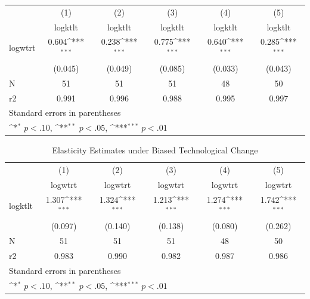 {
\def\sym#1{\ifmmode^{#1}\else\(^{#1}\)\fi}
\begin{tabular}{l*{5}{c}}
\hline\hline
                &\multicolumn{1}{c}{(1)}&\multicolumn{1}{c}{(2)}&\multicolumn{1}{c}{(3)}&\multicolumn{1}{c}{(4)}&\multicolumn{1}{c}{(5)}\\
                &\multicolumn{1}{c}{logktlt}&\multicolumn{1}{c}{logktlt}&\multicolumn{1}{c}{logktlt}&\multicolumn{1}{c}{logktlt}&\multicolumn{1}{c}{logktlt}\\
\hline
logwtrt         &    0.604\sym{***}&    0.238\sym{***}&    0.775\sym{***}&    0.640\sym{***}&    0.285\sym{***}\\
                &  (0.045)         &  (0.049)         &  (0.085)         &  (0.033)         &  (0.043)         \\
\hline
N               &       51         &       51         &       51         &       48         &       50         \\
r2              &    0.991         &    0.996         &    0.988         &    0.995         &    0.997         \\
\hline\hline
\multicolumn{6}{l}{\footnotesize Standard errors in parentheses}\\
\multicolumn{6}{l}{\footnotesize \sym{*} \(p<.10\), \sym{**} \(p<.05\), \sym{***} \(p<.01\)}\\
\end{tabular}
}
\begin{table}[htbp]\centering
\def\sym#1{\ifmmode^{#1}\else\(^{#1}\)\fi}
\caption{Elasticity Estimates under Biased Technological Change}
\begin{tabular}{l*{5}{c}}
\hline\hline
                    &\multicolumn{1}{c}{(1)}&\multicolumn{1}{c}{(2)}&\multicolumn{1}{c}{(3)}&\multicolumn{1}{c}{(4)}&\multicolumn{1}{c}{(5)}\\
                    &\multicolumn{1}{c}{logwtrt}&\multicolumn{1}{c}{logwtrt}&\multicolumn{1}{c}{logwtrt}&\multicolumn{1}{c}{logwtrt}&\multicolumn{1}{c}{logwtrt}\\
\hline
logktlt             &       1.307\sym{***}&       1.324\sym{***}&       1.213\sym{***}&       1.274\sym{***}&       1.742\sym{***}\\
                    &     (0.097)         &     (0.140)         &     (0.138)         &     (0.080)         &     (0.262)         \\
\hline
N                   &          51         &          51         &          51         &          48         &          50         \\
r2                  &       0.983         &       0.990         &       0.982         &       0.987         &       0.986         \\
\hline\hline
\multicolumn{6}{l}{\footnotesize Standard errors in parentheses}\\
\multicolumn{6}{l}{\footnotesize \sym{*} \(p<.10\), \sym{**} \(p<.05\), \sym{***} \(p<.01\)}\\
\end{tabular}
\end{table}
